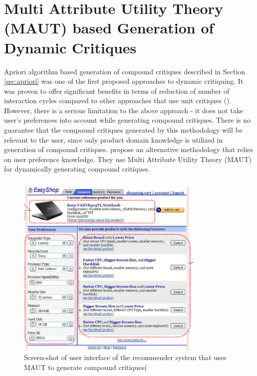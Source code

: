 \section{Multi Attribute Utility Theory (MAUT) based Generation of Dynamic Critiques}
\label{sec:maut}
Apriori algorithm based generation of compound critiques described in Section \ref{sec:apriori} was one of the first proposed approaches to dynamic critiquing.
It was proven to offer significant benefits in terms of reduction of number of interaction cycles compared to other approaches that use unit critiques (\cite{aprioriUserStudy}).
However, there is a serious limitation to the above approach - it does not take user's preferences into account while generating compound critiques.
There is no guarantee that the compound critiques generated by this methodology will be relevant to the user, since only product domain knowledge is utilized in generation of compound critiques.
\cite{mautPaper} propose an alternative methodology that relies on user preference knowledge.
They use Multi Attribute Utility Theory (MAUT) for dynamically generating compound critiques.
\begin{figure}
  \centering
    \includegraphics[width=0.8\textwidth]{figures-bharath/maut.png}
  \caption{Screen-shot of user interface of the recommender system that uses MAUT to generate compound critiques(\cite{mautPaper}}
\label{fig:maut}
\end{figure}


